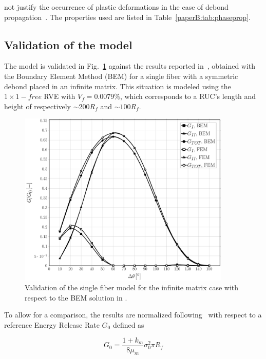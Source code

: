 not justify the occurrence of plastic deformations in the case of debond propagation~\cite{Asp1996}. The properties used are listed in Table~\ref{paperB:tab:phaseprop}.

\subsection{Validation of the model}

The model is validated in Fig.~\ref{paperB:fig:validation} against the results reported in~\cite{Paris2007,Sandino2016}, obtained with the Boundary Element Method (BEM) for a single fiber with a symmetric debond placed in an infinite matrix. This situation is modeled using the $1\times1-free$ RVE with $V_{f}=0.0079\%$, which corresponds to a RUC's length and height of respectively $\sim 200R_{f}$ and $\sim 100R_{f}$.

\begin{figure}[!h]
\centering
\includegraphics[width=0.9\textwidth]{paperB/validation-VCCT.pdf}
\caption{Validation of the single fiber model for the infinite matrix case with respect to the BEM solution in \cite{Sandino2016}.}\label{paperB:fig:validation}
\end{figure}

To allow for a comparison, the results are normalized following~\cite{Sandino2016} with respect to a reference Energy Release Rate $G_{0}$ defined as

\begin{equation}
G_{0}=\frac{1+k_{m}}{8\mu_{m}}\sigma_{0}^{2}\pi R_{f}
\end{equation}

